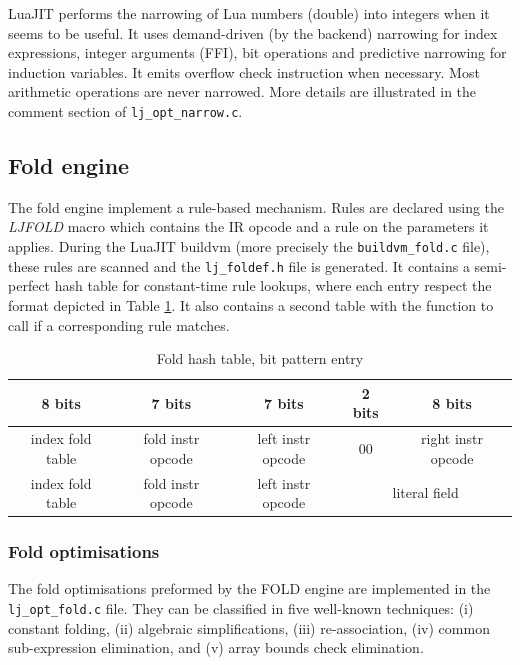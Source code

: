 LuaJIT performs the narrowing of Lua numbers (double) into integers when it seems
to be useful. It uses demand-driven (by the backend) narrowing for index
expressions, integer arguments (FFI), bit operations and predictive
narrowing for induction variables. It emits overflow check instruction when
necessary. Most arithmetic operations are never narrowed. More details are illustrated in the comment section of \texttt{lj\_opt\_narrow.c}.

\subsection{Fold engine}
\label{Subsec:fold}

The fold engine implement a rule-based mechanism. Rules are declared using the
\textit{LJFOLD} macro which contains the IR opcode and a rule on the parameters it
applies. During the LuaJIT buildvm (more precisely the \texttt{buildvm\_fold.c}
file), these rules are scanned and the \texttt{lj\_foldef.h} file is generated.
It contains a semi-perfect hash table for constant-time rule lookups, where each
entry respect the format depicted in Table \ref{tab:fold-format}. It also
contains a second table with the function to call if a corresponding rule
matches.

\begin{table}[H]
\centering
\caption{Fold hash table, bit pattern entry}
\label{tab:fold-format}
\begin{tabular}{|c|c|c|c|c|}
\hline
8 bits           & 7 bits            & 7 bits            & 2 bits   & 8 bits                      \\ \hline
index fold table & fold instr opcode & left instr opcode & 00       & right instr opcode      \\ \hline
index fold table & fold instr opcode & left instr opcode & \multicolumn{2}{c|}{literal field} \\ \hline
\end{tabular}
\end{table}

\subsubsection{Fold optimisations}
\label{Subsubsec:fold}

The fold optimisations preformed by the FOLD engine are implemented in the
\texttt{lj\_opt\_fold.c} file. They can be classified in five well-known techniques: (i) constant folding, (ii) algebraic simplifications, (iii) re-association, (iv) common sub-expression
elimination, and (v) array bounds check elimination.

